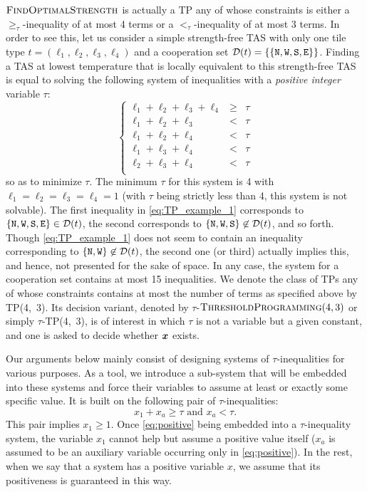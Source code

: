 \documentclass{article}
\theoremstyle{remark}
\theoremstyle{definition}
\newcommand{\findoptstrength}{\ensuremath{\mbox{\sc FindOptimalStrength}}}
\newcommand{\TP}{\ensuremath{\mbox{\sc ThresholdProgramming}}}
\newcommand{\north}{{\tt N}}
\newcommand{\west}{{\tt W}}
\newcommand{\south}{{\tt S}}
\newcommand{\east}{{\tt E}}
\renewcommand{\Vec}[1]{\ensuremath{\mbox{\boldmath$#1$}}}
\begin{document}
$\findoptstrength$ is actually a TP any of whose constraints is either a $\ge_\tau$-inequality of at most 4 terms or a $<_\tau$-inequality of at most 3 terms. 
In order to see this, let us consider a simple strength-free TAS with only one tile type $t = (\ell_1, \ell_2, \ell_3, \ell_4)$ and a cooperation set $\mathcal{D}(t) = \{\{\north, \west, \south, \east\}\}$.
Finding a TAS at lowest temperature that is locally equivalent to this strength-free TAS is equal to solving the following system of inequalities with a {\it positive integer} variable $\tau$: 
\begin{equation}\label{eq:TP_example_1}
\left\{
\begin{array}{lll}
  \ell_1 + \ell_2 + \ell_3 + \ell_4 &\ge& \tau \\
  \ell_1 + \ell_2 + \ell_3 &<& \tau \\
  \ell_1 + \ell_2 + \ell_4 &<& \tau \\
  \ell_1 + \ell_3 + \ell_4 &<& \tau \\
  \ell_2 + \ell_3 + \ell_4 &<& \tau \\
\end{array}
\right.
\end{equation}
so as to minimize $\tau$. 
The minimum $\tau$ for this system is 4 with $\ell_1 = \ell_2 = \ell_3 = \ell_4 = 1$ (with $\tau$ being strictly less than 4, this system is not solvable). 
The first inequality in \eqref{eq:TP_example_1} corresponds to $\{\north, \west, \south, \east\} \in \mathcal{D}(t)$, the second corresponds to $\{\north, \west, \south\} \not\in \mathcal{D}(t)$, and so forth. 
Though \eqref{eq:TP_example_1} does not seem to contain an inequality corresponding to $\{\north, \west\} \not\in \mathcal{D}(t)$, the second one (or third) actually implies this, and hence, not presented for the sake of space. 
In any case, the system for a cooperation set contains at most 15 inequalities. 
We denote the class of TPs any of whose constraints contains at most the number of terms as specified above by TP(4,~3). 
Its decision variant, denoted by $\tau$-$\TP(4, 3)$ or simply $\tau$-TP(4,~3), is of interest in which $\tau$ is not a variable but a given constant, and one is asked to decide whether $\Vec{x}$ exists. 

Our arguments below mainly consist of designing systems of $\tau$-inequalities for various purposes. 
As a tool, we introduce a sub-system that will be embedded into these systems and force their variables to assume at least or exactly some specific value. 
It is built on the following pair of $\tau$-inequalities: 
\begin{equation}\label{eq:positive}
	x_1 + x_a \ge \tau \mbox{ and } x_a < \tau. 
\end{equation} 
This pair implies $x_1 \ge 1$. 
Once \eqref{eq:positive} being embedded into a $\tau$-inequality system, the variable $x_1$ cannot help but assume a positive value itself ($x_a$ is assumed to be an auxiliary variable occurring only in \eqref{eq:positive}). 
In the rest, when we say that a system has a positive variable $x$, we assume that its positiveness is guaranteed in this way. 
\end{document}
